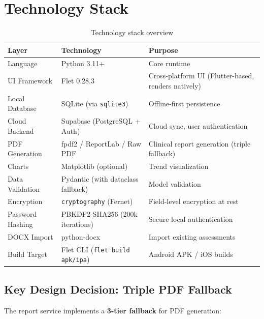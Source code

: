 \documentclass[12pt,a4paper]{article}
\begin{document}
\section{Technology Stack}

\begin{table}[H]
\centering
\renewcommand{\arraystretch}{1.3}
\begin{tabularx}{\textwidth}{l l X}
\toprule
\textbf{Layer} & \textbf{Technology} & \textbf{Purpose} \\
\midrule
Language         & Python 3.11+                          & Core runtime \\
UI Framework     & Flet 0.28.3                           & Cross-platform UI (Flutter-based, renders natively) \\
Local Database   & SQLite (via \texttt{sqlite3})          & Offline-first persistence \\
Cloud Backend    & Supabase (PostgreSQL + Auth)           & Cloud sync, user authentication \\
PDF Generation   & fpdf2 / ReportLab / Raw PDF            & Clinical report generation (triple fallback) \\
Charts           & Matplotlib (optional)                  & Trend visualization \\
Data Validation  & Pydantic (with dataclass fallback)     & Model validation \\
Encryption       & \texttt{cryptography} (Fernet)         & Field-level encryption at rest \\
Password Hashing & PBKDF2-SHA256 (200k iterations)        & Secure local authentication \\
DOCX Import      & python-docx                            & Import existing assessments \\
Build Target     & Flet CLI (\texttt{flet build apk/ipa}) & Android APK / iOS builds \\
\bottomrule
\end{tabularx}
\caption{Technology stack overview}
\end{table}

\subsection{Key Design Decision: Triple PDF Fallback}

The report service implements a \textbf{3-tier fallback} for PDF generation:
\end{document}
